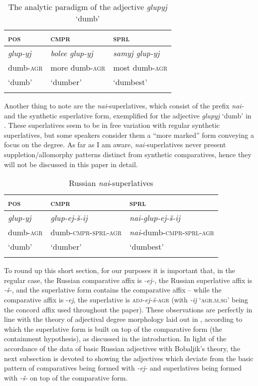 \documentclass[output=paper,colorlinks,citecolor=brown]{langscibook}
\begin{document}
\begin{table}
\caption{The analytic paradigm of the adjective \textit{glupyj} `dumb'}
\label{kas:tab:analytic}
 \begin{tabularx}{.8\textwidth}{QQl}
  \lsptoprule
        \textsc{pos}   &\textsc{cmpr}  & \textsc{sprl} \\
  \midrule
        \textit{glup-yj} &\textit{bolee glup-yj}&\textit{samyj glup-yj} \\
        {dumb-\textsc{agr}} & {more dumb-\textsc{agr}} & {most dumb-\textsc{agr}}  \\
        {`dumb'} & {`dumber'} & {`dumbest'}\\
  \lspbottomrule
 \end{tabularx}
\end{table}

Another thing to note are the \textit{nai}-superlatives, which consist of the prefix \textit{nai-} and the synthetic superlative form, exemplified for the adjective \textit{glupyj} `dumb' in . These superlatives seem to be in free variation with regular synthetic superlatives, but some speakers consider them a ``more marked'' form conveying a focus on the degree. As far as I am aware, \textit{nai-}superlatives never present suppletion/allomorphy patterns distinct from synthetic comparatives, hence they will not be discussed in this paper in detail.

\begin{table}
\caption{Russian \textit{nai}-superlatives}
\label{kas:tab:nai}
 \begin{tabularx}{.85\textwidth}{Qll} 
  \lsptoprule
        \textsc{pos}   &\textsc{cmpr}  & \textsc{sprl} \\
  \midrule
        \textit{glup-yj} &\textit{glup-ej-š-ij} &\textit{nai-glup-ej-š-ij} \\
        {dumb-\textsc{agr}} & {dumb-\textsc{cmpr-sprl-agr}} & \textit{nai}-{dumb-\textsc{cmpr-sprl-agr}}  \\
        {`dumb'} & {`dumber'} & {`dumbest'}\\
  \lspbottomrule
 \end{tabularx}
\end{table}

To round up this short section, for our purposes it is important that, in the regular case, the Russian comparative affix is \textit{-ej-}, the Russian superlative affix is \textit{-š-}, and the superlative form contains the comparative affix -- while the comparative affix is -\textit{ej}, the superlative is \textsc{adj}-\textit{ej-š-}\textsc{agr} (with \textit{-ij} `\textsc{agr.m.sg}' being the concord affix used throughout the paper). These observations are perfectly in line with the theory of adjectival degree morphology laid out in \citet{Bobaljik:2012}, according to which the superlative form is built on top of the comparative form (the containment hypothesis), as discussed in the introduction. In light of the accordance of the data of basic Russian adjectives with Bobaljik's theory, the next subsection is devoted to showing the adjectives which deviate from the basic pattern of comparatives being formed with \textit{-ej-} and superlatives being formed with \textit{-š-} on top of the comparative form.
\end{document}
